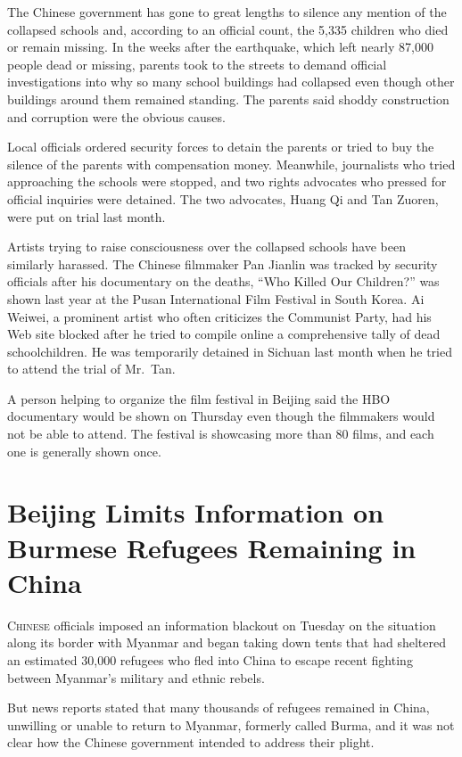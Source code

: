 ﻿\documentclass[12pt]{article}
\begin{document}
The Chinese government has gone to great lengths to silence any mention of the collapsed schools
and, according to an official count, the 5,335 children who died or remain missing. In the weeks
after the earthquake, which left nearly 87,000 people dead or missing, parents took to the streets
to demand official investigations into why so many school buildings had collapsed even though other
buildings around them remained standing. The parents said shoddy construction and corruption were
the obvious causes.

Local officials ordered security forces to detain the parents or tried to buy the silence of the
parents with compensation money. Meanwhile, journalists who tried approaching the schools were
stopped, and two rights advocates who pressed for official inquiries were detained. The two
advocates, Huang Qi and Tan Zuoren, were put on trial last month.

Artists trying to raise consciousness over the collapsed schools have been similarly harassed. The
Chinese filmmaker Pan Jianlin was tracked by security officials after his documentary on the deaths,
``Who Killed Our Children?'' was shown last year at the Pusan International Film Festival in South
Korea. Ai Weiwei, a prominent artist who often criticizes the Communist Party, had his Web site
blocked after he tried to compile online a comprehensive tally of dead schoolchildren. He was
temporarily detained in Sichuan last month when he tried to attend the trial of Mr.~Tan.

A person helping to organize the film festival in Beijing said the HBO documentary would be shown on
Thursday even though the filmmakers would not be able to attend. The festival is showcasing more
than 80 films, and each one is generally shown once.

\section{Beijing Limits Information on Burmese Refugees Remaining in China}

\lettrine{C}{hinese} officials imposed an information blackout on Tuesday on the situation along its
border with Myanmar and began taking down tents that had sheltered an estimated 30,000 refugees who
fled into China to escape recent fighting between Myanmar's military and ethnic rebels.

But news reports stated that many thousands of refugees remained in China, unwilling or unable to
return to Myanmar, formerly called Burma, and it was not clear how the Chinese government intended
to address their plight.
\end{document}
